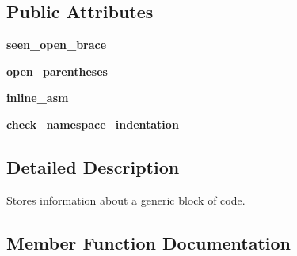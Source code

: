 \subsection*{Public Attributes}
\begin{DoxyCompactItemize}
\item 
{\bfseries seen\+\_\+open\+\_\+brace}\hypertarget{classcpplint_1_1__BlockInfo_aa974539217437751383ad20896c974d7}{}\label{classcpplint_1_1__BlockInfo_aa974539217437751383ad20896c974d7}

\item 
{\bfseries open\+\_\+parentheses}\hypertarget{classcpplint_1_1__BlockInfo_a02a0b48995a599f6b2bbaa6f16cca98a}{}\label{classcpplint_1_1__BlockInfo_a02a0b48995a599f6b2bbaa6f16cca98a}

\item 
{\bfseries inline\+\_\+asm}\hypertarget{classcpplint_1_1__BlockInfo_aad762ef7088f2f556a75c9a80006f4db}{}\label{classcpplint_1_1__BlockInfo_aad762ef7088f2f556a75c9a80006f4db}

\item 
{\bfseries check\+\_\+namespace\+\_\+indentation}\hypertarget{classcpplint_1_1__BlockInfo_a120822b07db37b3480a573ec29ee4457}{}\label{classcpplint_1_1__BlockInfo_a120822b07db37b3480a573ec29ee4457}

\end{DoxyCompactItemize}


\subsection{Detailed Description}
\begin{DoxyVerb}Stores information about a generic block of code.\end{DoxyVerb}
 

\subsection{Member Function Documentation}
